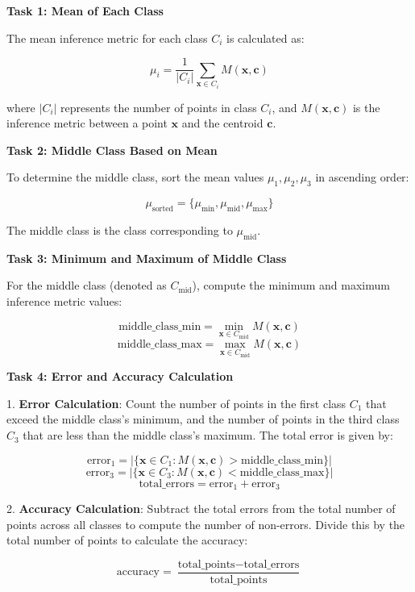 \textbf{Task 1: Mean of Each Class}

The mean inference metric for each class \( C_i \) is calculated as:

\[
\mu_i = \frac{1}{|C_i|} \sum_{\mathbf{x} \in C_i} M(\mathbf{x}, \mathbf{c})
\]

where \( |C_i| \) represents the number of points in class \( C_i \), and \( M(\mathbf{x}, \mathbf{c}) \) is the inference metric between a point \( \mathbf{x} \) and the centroid \( \mathbf{c} \).

\textbf{Task 2: Middle Class Based on Mean}

To determine the middle class, sort the mean values \( \mu_1, \mu_2, \mu_3 \) in ascending order:

\[
\mu_{\text{sorted}} = \{\mu_{\text{min}}, \mu_{\text{mid}}, \mu_{\text{max}}\}
\]

The middle class is the class corresponding to \( \mu_{\text{mid}} \).

\textbf{Task 3: Minimum and Maximum of Middle Class}

For the middle class (denoted as \( C_{\text{mid}} \)), compute the minimum and maximum inference metric values:

\[
\text{middle\_class\_min} = \min_{\mathbf{x} \in C_{\text{mid}}} M(\mathbf{x}, \mathbf{c})
\]
\[
\text{middle\_class\_max} = \max_{\mathbf{x} \in C_{\text{mid}}} M(\mathbf{x}, \mathbf{c})
\]

\textbf{Task 4: Error and Accuracy Calculation}

1. \textbf{Error Calculation}: Count the number of points in the first class \( C_1 \) that exceed the middle class's minimum, and the number of points in the third class \( C_3 \) that are less than the middle class's maximum. The total error is given by:

\[
\text{error}_1 = \left| \{\mathbf{x} \in C_1 : M(\mathbf{x}, \mathbf{c}) > \text{middle\_class\_min} \} \right|
\]
\[
\text{error}_3 = \left| \{\mathbf{x} \in C_3 : M(\mathbf{x}, \mathbf{c}) < \text{middle\_class\_max} \} \right|
\]
\[
\text{total\_errors} = \text{error}_1 + \text{error}_3
\]

2. \textbf{Accuracy Calculation}: Subtract the total errors from the total number of points across all classes to compute the number of non-errors. Divide this by the total number of points to calculate the accuracy:

\[
\text{accuracy} = \frac{\text{total\_points} - \text{total\_errors}}{\text{total\_points}}
\]

